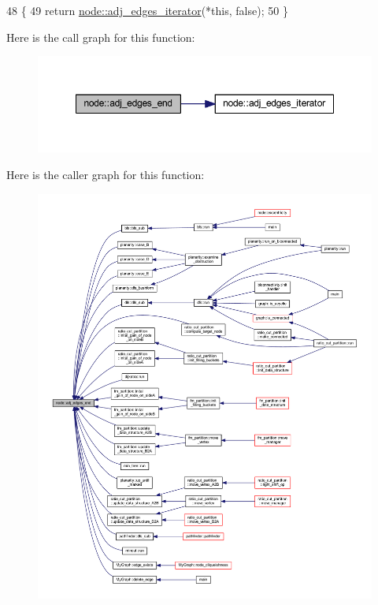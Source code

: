 \begin{DoxyCode}
48 \{
49     \textcolor{keywordflow}{return} \mbox{\hyperlink{classnode_a12cb1a2167f5f03c054de5e707d3156f}{node::adj\_edges\_iterator}}(*\textcolor{keyword}{this}, \textcolor{keyword}{false});
50 \}
\end{DoxyCode}
Here is the call graph for this function\+:\nopagebreak
\begin{figure}[H]
\begin{center}
\leavevmode
\includegraphics[width=348pt]{classnode_aa1e7887d29390297580769454f769ad6_cgraph}
\end{center}
\end{figure}
Here is the caller graph for this function\+:\nopagebreak
\begin{figure}[H]
\begin{center}
\leavevmode
\includegraphics[width=350pt]{classnode_aa1e7887d29390297580769454f769ad6_icgraph}
\end{center}
\end{figure}
\mbox{\label{classnode_a12cb1a2167f5f03c054de5e707d3156f}} 
